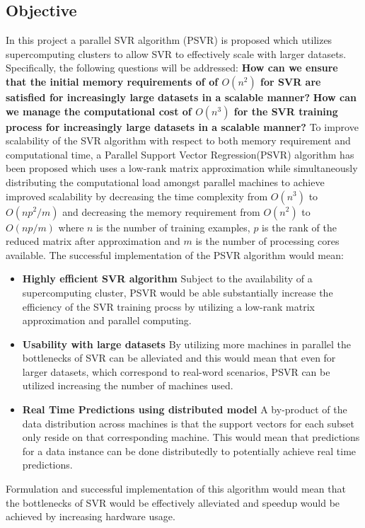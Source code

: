 \documentclass[12pt]{article}
\begin{document}
\subsection{Objective}
In this project a parallel SVR algorithm (PSVR) is proposed which utilizes supercomputing clusters to allow SVR to effectively scale with larger datasets.
Specifically, the following questions will be addressed:
\newline\newline
\setlength{\leftskip}{3cm}
{\bf How can we ensure that the initial memory requirements of of $O(n^2)$ for SVR are satisfied for increasingly large datasets in a scalable manner?}
\newline\newline
{\bf How can we manage the computational cost of $O(n^3)$ for the SVR training process for increasingly large datasets in a scalable manner?}
\setlength{\leftskip}{0pt}
\newline\newline
To improve scalability of the SVR algorithm with respect to both memory requirement and computational time, a Parallel Support Vector Regression(PSVR) algorithm has been proposed which uses a low-rank matrix approximation while simultaneously distributing the computational load amongst parallel machines to achieve improved scalability by decreasing the time complexity from $O(n^3)$ to $O(np^2/m)$ and decreasing the memory requirement from $O(n^2)$ to $O(np/m)$ where $n$ is the number of training examples, $p$ is the rank of the reduced matrix after approximation and $m$ is the number of processing cores available.
\newline\newline
The successful implementation of the PSVR algorithm would mean:
\begin{itemize}
\item {\bf Highly efficient SVR algorithm} 
Subject to the availability of a supercomputing cluster, PSVR would be able substantially increase the efficiency of the SVR training procss by utilizing a low-rank matrix approximation and parallel computing.
\item {\bf Usability with large datasets} By utilizing more machines in parallel the bottlenecks of SVR can be alleviated and this would mean that even for larger datasets, which correspond to real-word scenarios, PSVR can be utilized increasing the number of machines used.
\item {\bf Real Time Predictions using distributed model} A by-product of the data distribution across machines is that the support vectors for each subset only reside on that corresponding machine. This would mean that predictions for a data instance can be done distributedly to potentially achieve real time predictions.
\end{itemize}
Formulation and successful implementation of this algorithm would mean that the bottlenecks of SVR would be effectively alleviated and speedup would be achieved by increasing hardware usage.
\end{document}
